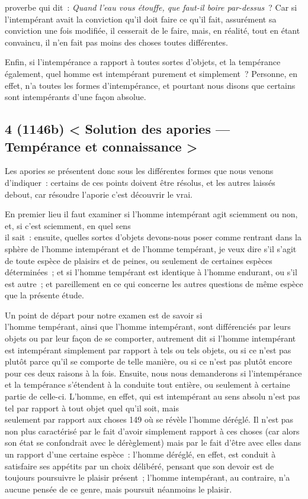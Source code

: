 \documentclass[french,twoside]{book} %
\begin{document}
proverbe qui dit : {\itshape Quand l’eau vous étouffe, que faut-il boire par-dessus} ? Car si l’intempérant avait la conviction qu’il doit  faire ce qu’il fait, assurément sa conviction une fois modifiée, il cesserait de le faire, mais, en réalité, tout en étant convaincu, il n’en fait pas moins des choses toutes différentes.\par
Enfin, si l’intempérance a rapport à toutes sortes d’objets, et la tempérance également, quel homme est intempérant purement et simplement ? Personne, en effet, n’a toutes les formes d’intempérance, et pourtant nous disons que certains \\
sont intempérants d’une façon absolue.
\subsection[{4 (1146b) < Solution des apories — Tempérance et connaissance >}]{4 (1146b) < Solution des apories — Tempérance et connaissance >}
\noindent Les apories se présentent donc sous les différentes formes que nous venons d’indiquer : certains de ces points doivent être résolus, et les autres laissés debout, car résoudre l’aporie c’est découvrir le vrai.\par
En premier lieu il faut examiner si l’homme intempérant agit sciemment ou non, et, si c’est sciemment, en quel sens \\
il sait : ensuite, quelles sortes d’objets devons-nous poser comme rentrant dans la sphère de l’homme intempérant et de l’homme tempérant, je veux dire s’il s’agit de toute espèce de plaisirs et de peines, ou seulement de certaines espèces déterminées ; et si l’homme tempérant est identique à l’homme endurant, ou s’il est autre ; et pareillement en ce qui concerne les autres questions de même espèce que la présente étude.\par
Un point de départ pour notre examen est de savoir si \\
l’homme tempérant, ainsi que l’homme intempérant, sont différenciés par leurs objets ou par leur façon de se comporter, autrement dit si l’homme intempérant est intempérant simplement par rapport à tels ou tels objets, ou si ce n’est pas plutôt parce qu’il se comporte de telle manière, ou si ce n’est pas plutôt encore pour ces deux raisons à la fois. Ensuite, nous nous demanderons si l’intempérance et la tempérance s’étendent à la conduite tout entière, ou seulement à certaine partie de celle-ci. L’homme, en effet, qui est intempérant au sens absolu n’est pas tel par rapport à tout objet quel qu’il soit, mais \\
seulement par rapport aux choses 149 où se révèle l’homme déréglé. Il n’est pas non plus caractérisé par le fait d’avoir simplement rapport à ces choses (car alors son état se confondrait avec le dérèglement) mais par le fait d’être avec elles dans un rapport d’une certaine espèce : l’homme déréglé, en effet, est conduit à satisfaire ses appétits par un choix délibéré, pensant que son devoir est de toujours poursuivre le plaisir présent ; l’homme intempérant, au contraire, n’a aucune pensée de ce genre, mais poursuit néanmoins le plaisir.
\end{document}
